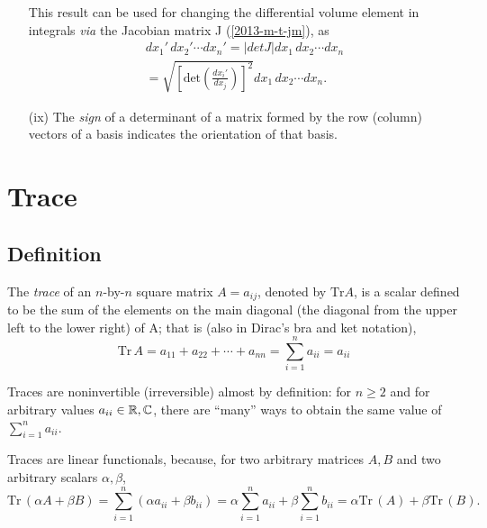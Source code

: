 \begin{itemize}
This result can be used for changing the differential volume element in integrals {\it via} the Jacobian matrix J
(\ref{2013-m-t-jm}), as
\begin{equation}
\begin{split}
dx_1'\, dx_2' \cdots dx_n'
= \vert det J \vert dx_1\, dx_2 \cdots dx_n     \\
= \sqrt{\left[\textrm{det}\left(\frac{dx_i'}{dx_j}\right)\right]^2} dx_1\, dx_2 \cdots dx_n
.
\end{split}
\end{equation}

\item[(ix)]
The {\em sign} of a  determinant of a matrix formed by the row (column)
 vectors of a basis indicates the {orientation}
of that basis.

\end{itemize}


\section{Trace}
\label{2013-ch-fdvs-trace}

\subsection{Definition}
The {\em trace} of an $n$-by-$n$ square matrix $A=a_{ij}$, denoted by
$\textrm{Tr} A$,  is a scalar
defined to be the sum of the elements on the main diagonal
 (the diagonal from the upper left to the lower right) of A; that is  (also in Dirac's bra and ket notation),
\begin{equation}
\textrm{Tr}\,A
= a_{11} +a_{22}+ \cdots +a_{nn}
=\sum_{i=1}^n a_{ii}
=  a_{ii}%
\end{equation}

Traces are noninvertible (irreversible) almost by definition: for $n\ge 2$ and for arbitrary values $a_{ii} \in {\Bbb R}, {\Bbb C}$, there are
``many''  ways to obtain the same value of $ \sum_{i=1}^n a_{ii} $.

Traces are linear functionals, because, for two arbitrary matrices $A,B$
and two arbitrary scalars $\alpha, \beta$,
\begin{equation}
\textrm{Tr}\,(\alpha A + \beta B)
=\sum_{i=1}^n (\alpha a_{ii} + \beta b_{ii})
= \alpha \sum_{i=1}^n a_{ii} + \beta \sum_{i=1}^n  b_{ii}
=
\alpha \textrm{Tr}\,(A)+ \beta \textrm{Tr}\,(B)
.
\end{equation}

